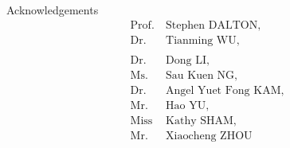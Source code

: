 \documentclass[11pt]{beamer}
\begin{document}

%
%     
%     


\begin{frame}
    \begin{center}
        {\huge Acknowledgements}
        \begin{align*}
            \text{Prof.}~& \text{Stephen DALTON,} \\
            \text{Dr.}~& \text{Tianming WU,} \\\\
            \text{Dr.}~& \text{Dong LI,} \\
            \text{Ms.}~& \text{Sau Kuen NG,} \\
            \text{Dr.}~& \text{Angel Yuet Fong KAM,} \\
            \text{Mr.}~& \text{Hao YU,} \\
            \text{Miss}~& \text{Kathy SHAM,} \\
            \text{Mr.}~& \text{Xiaocheng ZHOU}
        \end{align*}
    \end{center}
\end{frame}
\end{document}
